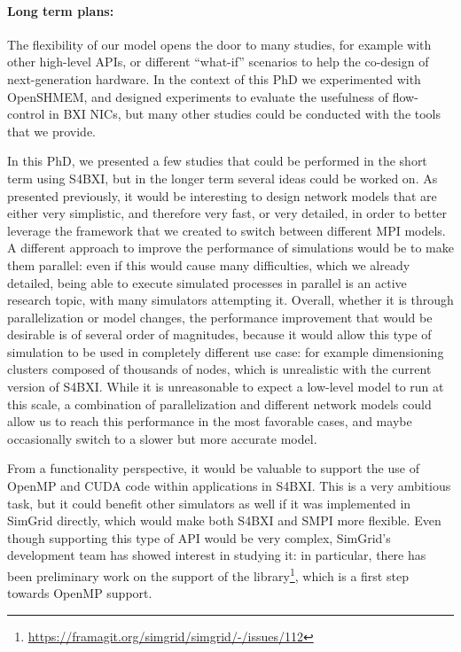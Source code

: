 \paragraph{Long term plans:} The flexibility of our model opens the door to many
studies, for example with other high-level APIs, or different ``what-if''
scenarios to help the co-design of next-generation hardware. In the context of
this PhD we experimented with OpenSHMEM, and designed experiments to evaluate
the usefulness of flow-control in BXI NICs, but many other studies could be
conducted with the tools that we provide. 

In this PhD, we presented a few studies that could be performed in the short
term using S4BXI, but in the longer term several ideas could be worked on. As
presented previously, it would be interesting to design network models that are
either very simplistic, and therefore very fast, or very detailed, in order to
better leverage the framework that we created to switch between different MPI
models. A different approach to improve the performance of simulations would be
to make them parallel: even if this would cause many difficulties, which we
already detailed, being able to execute simulated processes in parallel is an
active research topic, with many simulators attempting it. Overall, whether it
is through parallelization or model changes, the performance improvement that
would be desirable is of several order of magnitudes, because it would allow
this type of simulation to be used in completely different use case: for example
dimensioning clusters composed of thousands of nodes, which is unrealistic with
the current version of S4BXI. While it is unreasonable to expect a low-level
model to run at this scale, a combination of parallelization and different
network models could allow us to reach this performance in the most favorable
cases, and maybe occasionally switch to a slower but more accurate model.

From a functionality perspective, it would be valuable to support the use of
OpenMP and CUDA code within applications in S4BXI. This is a very ambitious
task, but it could benefit other simulators as well if it was implemented in
SimGrid directly, which would make both S4BXI and SMPI more flexible. Even
though supporting this type of API would be very complex, SimGrid's development
team has showed interest in studying it: in particular, there has been
preliminary work on the support of the
library\footnote{\url{https://framagit.org/simgrid/simgrid/-/issues/112}}, which
is a first step towards OpenMP support.
